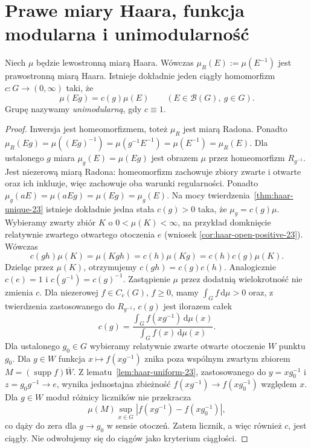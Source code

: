 \section{Prawe miary Haara, funkcja modularna i unimodularność}
\begin{twierdzenie}
\label{thm:haar-modular-23}
Niech $\mu$ będzie lewostronną miarą Haara.
Wówczas $\mu_R(E):=\mu(E^{-1})$ jest prawostronną
miarą Haara. Istnieje dokładnie jeden ciągły
homomorfizm $c:G\to(0,\infty)$ taki, że
\begin{equation}\label{eq:haar-modular-23}
 \mu(Eg)=c(g)\mu(E)\qquad(E\in\mathcal B(G),\ g\in G).
\end{equation}
Grupę nazywamy \emph{unimodularną}, gdy $c\equiv1$.
\end{twierdzenie}
\begin{proof}
Inwersja jest homeomorfizmem, toteż $\mu_R$ jest
miarą Radona. Ponadto
$\mu_R(Eg)=\mu((Eg)^{-1})=\mu(g^{-1}E^{-1})
=\mu(E^{-1})=\mu_R(E)$.
Dla ustalonego $g$ miara $\mu_g(E)=\mu(Eg)$
jest obrazem $\mu$ przez homeomorfizm $R_{g^{-1}}$.
Jest niezerową miarą Radona: homeomorfizm zachowuje
zbiory zwarte i otwarte oraz ich inkluzje, więc
zachowuje oba warunki regularności. Ponadto
$\mu_g(aE)=\mu(aEg)=\mu(Eg)=\mu_g(E)$.
Na mocy twierdzenia~\ref{thm:haar-unique-23} istnieje
dokładnie jedna stała $c(g)>0$ taka, że
$\mu_g=c(g)\mu$.
Wybieramy zwarty zbiór $K$ o $0<\mu(K)<\infty$,
na przykład domknięcie relatywnie zwartego otwartego
otoczenia $e$ (wniosek \ref{cor:haar-open-positive-23}).
Wówczas
\[
 c(gh)\mu(K)=\mu(Kgh)=c(h)\mu(Kg)
 =c(h)c(g)\mu(K).
\]
Dzieląc przez $\mu(K)$, otrzymujemy
$c(gh)=c(g)c(h)$. Analogicznie $c(e)=1$ i
$c(g^{-1})=c(g)^{-1}$. Zastąpienie $\mu$ przez
dodatnią wielokrotność nie zmienia $c$.
Dla niezerowej $f\in C_c(G)$, $f\ge0$,
mamy $\int_G f\,\mathrm d\mu>0$ oraz, z twierdzenia
 zastosowanego do
$R_{g^{-1}}$, $c(g)$ jest ilorazem całek
\[
 c(g)=\frac{\int_G f(xg^{-1})\,\mathrm d\mu(x)}
 {\int_G f(x)\,\mathrm d\mu(x)}.
\]
Dla ustalonego $g_0\in G$ wybieramy relatywnie zwarte
otwarte otoczenie $W$ punktu $g_0$. Dla $g\in W$ funkcja
$x\mapsto f(xg^{-1})$ znika poza wspólnym zwartym zbiorem
$M=(\operatorname{supp}f)\overline W$.
Z lematu~\ref{lem:haar-uniform-23}, zastosowanego do
$y=xg_0^{-1}$ i $z=g_0g^{-1}\to e$, wynika jednostajna
zbieżność $f(xg^{-1})\to f(xg_0^{-1})$ względem $x$.
Dla $g\in W$ moduł różnicy liczników nie przekracza
\[
 \mu(M)\sup_{x\in G}|f(xg^{-1})-f(xg_0^{-1})|,
\]
co dąży do zera dla $g\to g_0$ w sensie otoczeń.
Zatem licznik, a więc również $c$, jest ciągły.
Nie odwołujemy się do ciągów jako kryterium ciągłości.
\end{proof}

